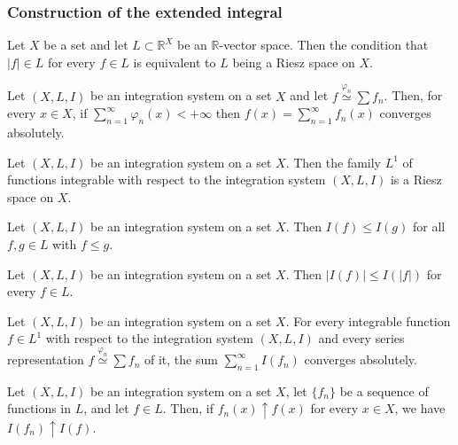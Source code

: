 \subsubsection{Construction of the extended integral}

\begin{lemma}\label{lem:equiv-condition-for-riesz-space}
  Let $X$ be a set and let $L\subset\mathbb{R}^X$ be an
  $\mathbb{R}$-vector space.
  Then the condition that $|f|\in L$ for every $f\in L$ is equivalent to $L$
  being a Riesz space on $X$.
\end{lemma}

\begin{lemma}\label{lem:series-exp-is-abs-conv}
  Let $(X,L,I)$ be an integration system on a set $X$ and let
  $f\overset{\varphi_n}{\simeq}\sum f_n$.
  Then, for every $x\in X$, if $\sum_{n=1}^\infty \varphi_n(x)<+\infty$ then
  $f(x)=\sum_{n=1}^\infty f_n(x)$ converges absolutely.
\end{lemma}

\begin{theorem}\label{thm:l1-is-riesz-space}
  Let $(X,L,I)$ be an integration system on a set $X$.
  Then the family $L^1$ of functions integrable with respect to the integration
  system $(X,L,I)$ is a Riesz space on $X$.
\end{theorem}

\begin{lemma}\label{lem:integration-preserve-order}
  Let $(X,L,I)$ be an integration system on a set $X$.
  Then $I(f)\le I(g)$ for all $f,g\in L$ with $f\le g$.
\end{lemma}

\begin{lemma}\label{lem:triangle-ineq-for-integration}
  Let $(X,L,I)$ be an integration system on a set $X$.
  Then $|I(f)|\le I(|f|)$ for every $f\in L$.
\end{lemma}

\begin{lemma}\label{lem:abs-conv-for-int-of-series-rep}
  Let $(X,L,I)$ be an integration system on a set $X$.
  For every integrable function $f\in L^1$ with respect to the integration
  system $(X,L,I)$ and every series representation
  $f\overset{\varphi_n}{\simeq}\sum f_n$ of it, the sum
  $\sum_{n=1}^\infty I(f_n)$ converges absolutely.
\end{lemma}

\begin{lemma}\label{lem:integration-is-continuous}
  Let $(X,L,I)$ be an integration system on a set $X$, let $\{f_n\}$ be
  a sequence of functions in $L$, and let $f\in L$.
  Then, if $f_n(x)\uparrow f(x)$ for every $x\in X$, we have
  $I(f_n)\uparrow I(f)$.
\end{lemma}

